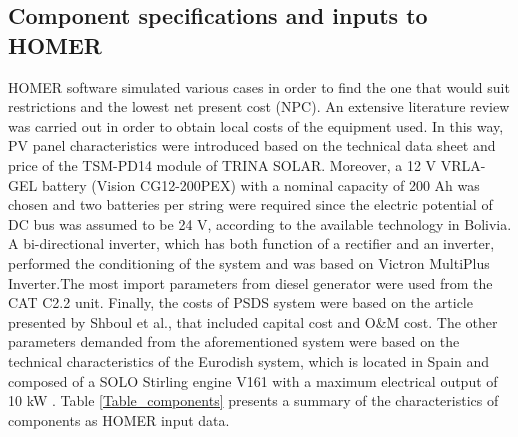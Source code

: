 \documentclass{ECOS_2019}
\begin{document}
\subsection{Component specifications and inputs to HOMER}
HOMER software simulated various cases in order to find the one that would suit restrictions and the lowest net present cost (NPC). An extensive literature review was carried out in order to obtain local costs of the equipment used\cite{ENERSOLS.A.2021}. In this way, PV panel characteristics were introduced based on the technical data sheet and price of the TSM-PD14 module of TRINA SOLAR\cite{TrinaSolar2017}. Moreover, a 12 V VRLA-GEL battery (Vision CG12-200PEX) with a nominal capacity of 200 Ah was chosen\cite{ShenzhenCenterPowerTech2014} and two batteries per string were required since the electric potential of DC bus was assumed to be 24 V, according to the available technology in Bolivia. A bi-directional inverter, which has both function of a rectifier and an inverter, performed the conditioning of the system and was based on Victron MultiPlus Inverter\cite{VictronEnergy2014}.The most import parameters from diesel generator were used from the CAT C2.2 unit\cite{CaterpillarInc.2021}. Finally, the costs of PSDS system were based on the article presented by Shboul et al.\cite{Shboul2021}, that included capital cost and O\&M cost. The other parameters demanded from the aforementioned system were based on the technical characteristics of the Eurodish system, which is located in Spain and composed of a SOLO Stirling engine V161 with a maximum electrical output of 10 kW \cite{GavilanConde2011,Babikir2020}. Table \ref{Table_components} presents a summary of the characteristics of components as HOMER input data.
\begin{table}[h]
\caption{Summary of specification of components.}
\begin{center}
\end{center}
\label{Table_components}
\end{table}
\end{document}

